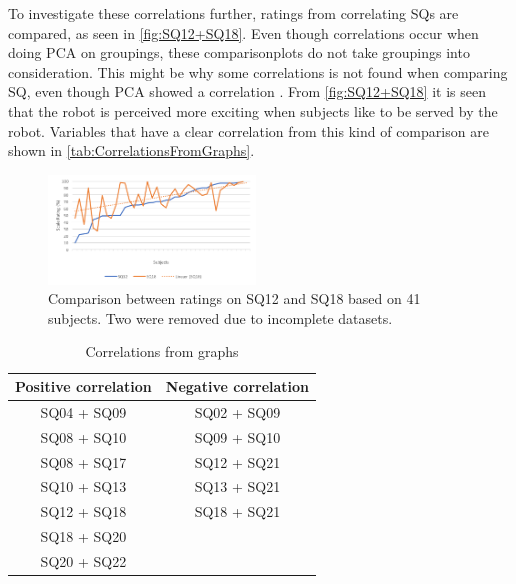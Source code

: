 To investigate these correlations further, ratings from correlating SQs are compared, as seen in \autoref{fig:SQ12+SQ18}. Even though correlations occur when doing PCA on groupings, these comparisonplots do not take groupings into consideration. This might be why some correlations is not found when comparing SQ, even though PCA showed a correlation . From \autoref{fig:SQ12+SQ18} it is seen that the robot is perceived more exciting when subjects like to be served by the robot. Variables that have a clear correlation from this kind of comparison are shown in \autoref{tab:CorrelationsFromGraphs}.
%
\begin{figure}[H]
	\centering
	\includegraphics[width = 0.49\textwidth]{Figure/SQ12+SQ18}
	\setlength{} 
	\caption{Comparison between ratings on SQ12 and SQ18 based on 41 subjects. Two were removed due to incomplete datasets.}
	\label{fig:SQ12+SQ18}
\end{figure}
\noindent
%
\begin{table}
	\centering
	\caption{Correlations from graphs}
	\label{tab:CorrelationsFromGraphs} 
	\begin{tabular}{ c|c }
		\centering
		Positive correlation & Negative correlation \\ \hline
		SQ04 + SQ09 & SQ02 + SQ09 \\ 
		SQ08 + SQ10 & SQ09 + SQ10 \\ 
		SQ08 + SQ17 & SQ12 + SQ21 \\ 
		SQ10 + SQ13 & SQ13 + SQ21 \\ 
		SQ12 + SQ18 & SQ18 + SQ21	\\	
		SQ18 + SQ20 & 							\\
		SQ20 + SQ22 & 
	\end{tabular}        
\end{table}
\noindent
%

